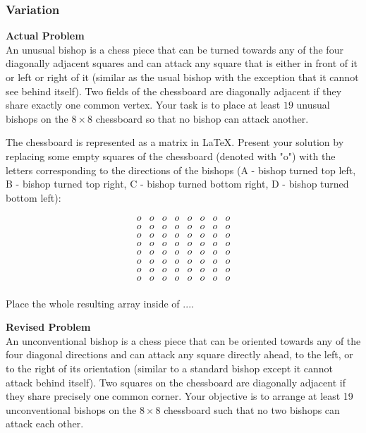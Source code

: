 \subsubsection{Variation}
\textbf{Actual Problem}\\
An unusual bishop is a chess piece that can be turned towards any of the four diagonally adjacent squares and can attack any square that is either in front of it or left or right of it (similar as the usual bishop with the exception that it cannot see behind itself).
Two fields of the chessboard are diagonally adjacent if they share exactly one common vertex. Your task is to place at least $19$ unusual bishops on the $8 \times 8$ chessboard so that no bishop can attack another.

The chessboard is represented as a matrix in LaTeX. 
Present your solution by replacing some empty squares of the chessboard (denoted with "o") with the letters corresponding to the directions of the bishops (A - bishop turned top left, B - bishop turned top right, C - bishop turned bottom right, D - bishop turned bottom left):

$$\begin{array}{cccccccc}
o & o & o & o & o & o & o & o \\
o & o & o & o & o & o & o & o \\
o & o & o & o & o & o & o & o \\
o & o & o & o & o & o & o & o \\
o & o & o & o & o & o & o & o \\
o & o & o & o & o & o & o & o \\
o & o & o & o & o & o & o & o \\
o & o & o & o & o & o & o & o \\
\end{array}$$

Place the whole resulting array inside of $\boxed{...}$.


\textbf{Revised Problem}\\
An unconventional bishop is a chess piece that can be oriented towards any of the four diagonal directions and can attack any square directly ahead, to the left, or to the right of its orientation (similar to a standard bishop except it cannot attack behind itself). Two squares on the chessboard are diagonally adjacent if they share precisely one common corner. Your objective is to arrange at least 19 unconventional bishops on the $8 \times 8$ chessboard such that no two bishops can attack each other.

